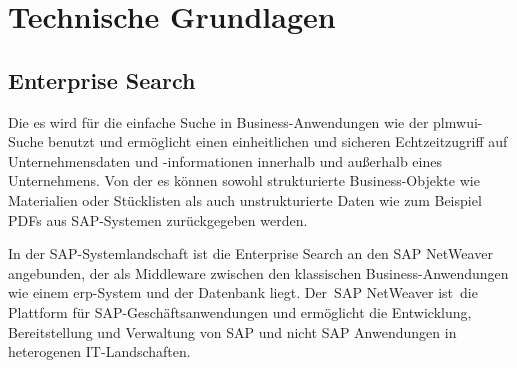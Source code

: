 \section{Technische Grundlagen}

\subsection{Enterprise Search}

Die \acl{es} wird für die einfache Suche in Business-Anwendungen wie der \ac{plmwui}-Suche benutzt und ermöglicht einen einheitlichen und sicheren Echtzeitzugriff auf Unternehmensdaten und -informationen innerhalb und außerhalb eines Unternehmens. Von der \ac{es} können sowohl strukturierte Business-Objekte wie Materialien oder Stücklisten als auch unstrukturierte Daten wie zum Beispiel PDFs aus SAP-Systemen zurückgegeben werden.\autocite[Vgl.][]{NetWeaverES} 

In der SAP-Systemlandschaft ist die Enterprise Search an den SAP NetWeaver angebunden, der als Middleware zwischen den klassischen Business-Anwendungen wie einem \ac{erp}-System und der Datenbank liegt.\autocite[Vgl.][S.13-15]{SAPTEC} Der SAP NetWeaver ist die Plattform für SAP-Geschäftsanwendungen und ermöglicht die Entwicklung, Bereitstellung und Verwaltung von SAP und nicht SAP Anwendungen in heterogenen IT-Landschaften.\autocite[Vgl.][S.8]{SAP01}

